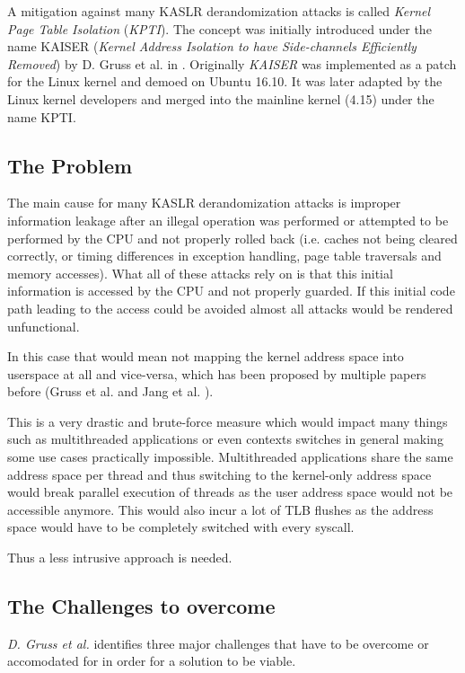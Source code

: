 A mitigation against many KASLR derandomization attacks is called \textit{Kernel Page Table Isolation} (\textit{KPTI}).
The concept was initially introduced under the name KAISER (\textit{Kernel Address Isolation to have Side-channels Efficiently Removed}) by D. Gruss et al. in \cite{kaiser}.
Originally \textit{KAISER} was implemented as a patch for the Linux kernel and demoed on Ubuntu 16.10.
It was later adapted by the Linux kernel developers and merged into the mainline kernel (4.15) under the name KPTI.

\subsection{The Problem}

The main cause for many KASLR derandomization attacks is improper information leakage after an illegal operation was performed or attempted to be performed by the CPU and not properly rolled back (i.e. caches not being cleared correctly, or timing differences in exception handling, page table traversals and memory accesses).
What all of these attacks rely on is that this initial information is accessed by the CPU and not properly guarded.
If this initial code path leading to the access could be avoided almost all attacks would be rendered unfunctional. \cite{kaiser}

In this case that would mean not mapping the kernel address space into userspace at all and vice-versa, which has been proposed by multiple papers before (Gruss et al. \cite{prefetch-side-channel-smap} and Jang et al. \cite{drk}).

This is a very drastic and brute-force measure which would impact many things such as multithreaded applications or even contexts switches in general making some use cases practically impossible.
Multithreaded applications share the same address space per thread and thus switching to the kernel-only address space would break parallel execution of threads as the user address space would not be accessible anymore.
This would also incur a lot of TLB flushes as the address space would have to be completely switched with every syscall.\cite{kaiser}

Thus a less intrusive approach is needed.

\subsection{The Challenges to overcome}

\textit{D. Gruss et al.} \cite{kaiser} identifies three major challenges that have to be overcome or accomodated for in order for a solution to be viable.

